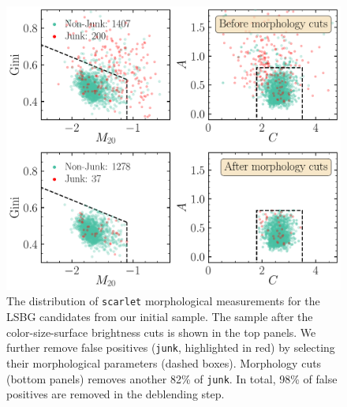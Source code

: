 \documentclass[twocolumn,astrosymb,twocolappendix]{aastex631}
\newcommand{\code}[1]{\texttt{#1}}
\begin{document}
\begin{CJK*}{UTF8}{gbsn}
\begin{figure}
    \centering
    \includegraphics[width=1\linewidth]{deblending_cuts_morph.pdf}
    \caption{The distribution of \code{scarlet} morphological measurements for the LSBG candidates from our initial sample. The sample after the color-size-surface brightness cuts is shown in the top panels. We further remove false positives (\code{junk}, highlighted in red) by selecting their morphological parameters (dashed boxes). Morphology cuts (bottom panels) removes another 82\% of \code{junk}. In total, 98\% of false positives are removed in the deblending step.
	}
	\label{fig:deblending_cuts}
\end{figure}


\end{CJK*}
\end{document}
